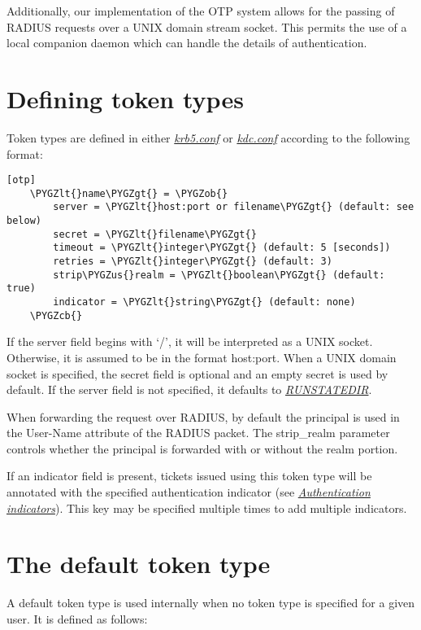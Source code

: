 \documentclass[letterpaper,10pt,english]{sphinxmanual}
\def\PYGZus{\char`\_}
\def\PYGZob{\char`\{}
\def\PYGZcb{\char`\}}
\def\PYGZlt{\char`\<}
\def\PYGZgt{\char`\>}
\begin{document}
Additionally, our implementation of the OTP system allows for the
passing of RADIUS requests over a UNIX domain stream socket.  This
permits the use of a local companion daemon which can handle the
details of authentication.


\section{Defining token types}
\label{admin/otp:defining-token-types}
Token types are defined in either {\hyperref[admin/conf_files/krb5_conf:krb5-conf-5]{\emph{krb5.conf}}} or
{\hyperref[admin/conf_files/kdc_conf:kdc-conf-5]{\emph{kdc.conf}}} according to the following format:

\begin{Verbatim}[commandchars=\\\{\}]
[otp]
    \PYGZlt{}name\PYGZgt{} = \PYGZob{}
        server = \PYGZlt{}host:port or filename\PYGZgt{} (default: see below)
        secret = \PYGZlt{}filename\PYGZgt{}
        timeout = \PYGZlt{}integer\PYGZgt{} (default: 5 [seconds])
        retries = \PYGZlt{}integer\PYGZgt{} (default: 3)
        strip\PYGZus{}realm = \PYGZlt{}boolean\PYGZgt{} (default: true)
        indicator = \PYGZlt{}string\PYGZgt{} (default: none)
    \PYGZcb{}
\end{Verbatim}

If the server field begins with `/', it will be interpreted as a UNIX
socket.  Otherwise, it is assumed to be in the format host:port.  When
a UNIX domain socket is specified, the secret field is optional and an
empty secret is used by default.  If the server field is not
specified, it defaults to {\hyperref[mitK5defaults:paths]{\emph{RUNSTATEDIR}}}.

When forwarding the request over RADIUS, by default the principal is
used in the User-Name attribute of the RADIUS packet.  The strip\_realm
parameter controls whether the principal is forwarded with or without
the realm portion.

If an indicator field is present, tickets issued using this token type
will be annotated with the specified authentication indicator (see
{\hyperref[admin/auth_indicator:auth-indicator]{\emph{Authentication indicators}}}).  This key may be specified multiple times to
add multiple indicators.


\section{The default token type}
\label{admin/otp:the-default-token-type}
A default token type is used internally when no token type is specified for a
given user.  It is defined as follows:
\end{document}

